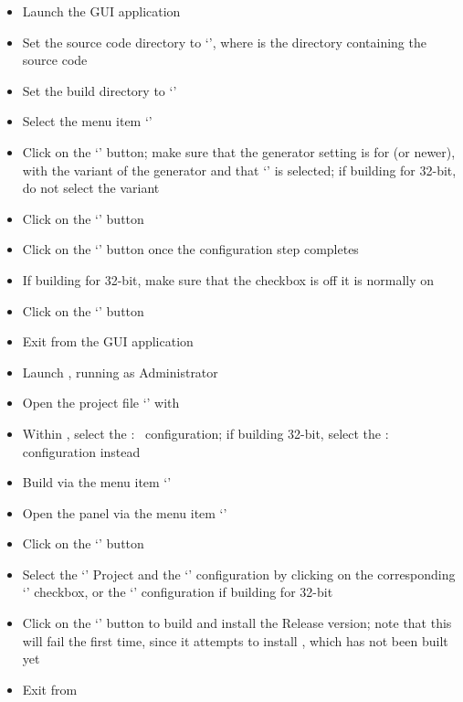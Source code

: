 \begin{itemize}
\item Launch the  GUI application
\item\exSp{}Set the source code directory to
`', where 
is the directory containing the \mplusm{} source code
\item\exSp{}Set the build directory to
`'
\item\exSp{}Select the menu item `'
\item\exSp{}Click on the `' button; make sure that the generator
setting is for  (or newer), with the  variant of
the generator and that `' is selected; if building
for 32-bit, do not select the  variant
\item\exSp{}Click on the `' button
\item\exSp{}Click on the `' button once the configuration step
completes
\item\exSp{}If building for 32-bit, make sure that the checkbox  is off
\longDash{} it is normally on
\item\exSp{}Click on the `' button
\item\exSp{}Exit from the  GUI application
\item\exSp{}Launch , running as Administrator
\item\exSp{}Open the project file
`' with
\item\exSp{}Within , select the  :\ 
configuration; if building 32-bit, select the  :\ 
configuration instead
\item\exSp{}Build via the menu item `'
\item\exSp{}Open the  panel via the menu item
`'
\item\exSp{}Click on the `' button
\item\exSp{}Select the `' Project and the `'
configuration by clicking on the corresponding `' checkbox, or the
`' configuration if building for 32-bit
\item\exSp{}Click on the `' button to build and install the Release
version; note that this will fail the first time, since it attempts to install
\textit{\MMMU}, which has not been built yet
\item\exSp{}Exit from 
\end{itemize}
